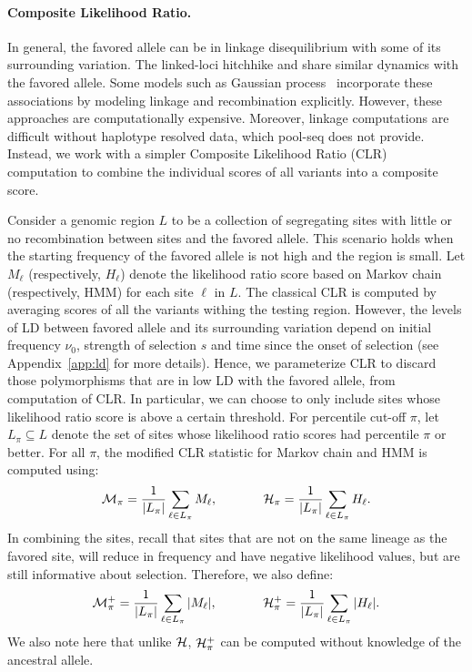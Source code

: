 \paragraph{Composite Likelihood Ratio.}
In general, the favored allele can be in linkage disequilibrium with
some of its surrounding variation. The linked-loci hitchhike and share
similar dynamics with the favored allele.  Some models such as
Gaussian process~\cite{Terhorst2015Multi} incorporate these
associations by modeling linkage and recombination
explicitly. However, these approaches are computationally
expensive. Moreover, linkage computations are difficult without
haplotype resolved data, which pool-seq does not provide. Instead, we
work with a simpler Composite Likelihood Ratio
(CLR)~\cite{nielsen2005genomic,williamson2007localizing} computation
to combine the individual scores of all variants into a composite
score.


Consider a genomic region $L$ to be a collection of segregating sites
with little or no recombination between sites and the favored
allele. This scenario holds when the starting frequency of the favored
allele is not high and the region is small. Let $M_\ell$
(respectively, $H_\ell$) denote the likelihood ratio score based on
Markov chain (respectively, HMM) for each site $\ell$ in $L$. The
classical CLR is computed by averaging scores of all the variants
withing the testing region.  However, the levels of LD between favored
allele and its surrounding variation depend on initial frequency
$\nu_0$, strength of selection $s$ and time since the onset of
selection (see Appendix~\ref{app:ld} for more details).  Hence, we
parameterize CLR to discard those polymorphisms that are in low LD
with the favored allele, from computation of CLR.  In particular, we
can choose to only include sites whose likelihood ratio score is above
a certain threshold. For percentile cut-off $\pi$, let
$L_{\pi}\subseteq L$ denote the set of sites whose likelihood ratio
scores had percentile $\pi$ or better. For all $\pi$, the modified CLR
statistic for Markov chain and HMM is computed using: 
\begin{equation}
 {\cal M}_{\pi} = \frac{1}{|L_{\pi}|}\sum_{\ell \in L_{\pi}}M_\ell,
\hspace{0.5in}
 {\cal H}_{\pi} = \frac{1}{|L_{\pi}|}\sum_{\ell \in L_{\pi}} H_\ell.
\label{eq:pihmm}
\end{equation}
In combining the sites, recall that sites that are not on the same
lineage as the favored site, will reduce in frequency and have
negative likelihood values, but are still informative about
selection. Therefore, we also define:
\begin{equation}
 {\cal M}^{+}_{\pi} = \frac{1}{|L_{\pi}|}\sum_{\ell \in L_{\pi}}\vert M_\ell\vert ,
\hspace{0.5in}
 {\cal H}^{+}_{\pi} = \frac{1}{|L_{\pi}|}\sum_{\ell \in L_{\pi}}\vert H_\ell\vert.
\label{eq:pihmmplus}
\end{equation}
We also note here that unlike ${\cal H}$, ${\cal H}^{+}_{\pi}$ can be computed
without knowledge of the ancestral allele.

